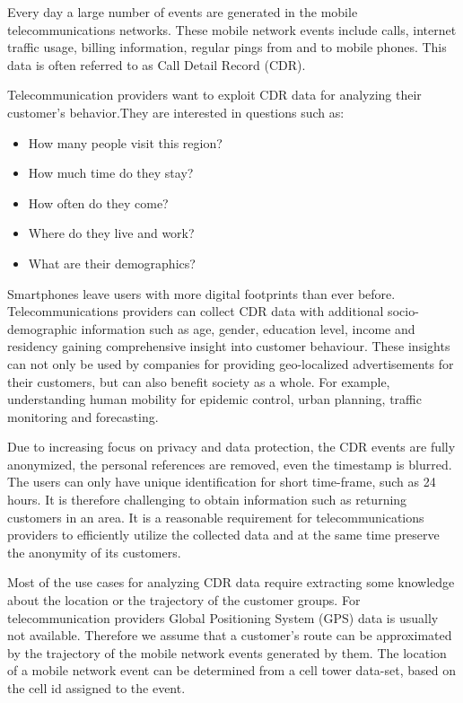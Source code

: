 Every day a large number of events are generated in the mobile telecommunications networks. These mobile network events include calls, internet traffic usage, billing information, regular pings from and to mobile phones. This data is often referred to as Call Detail Record (CDR).

Telecommunication providers want to exploit CDR data for analyzing their customer's behavior.They are interested in questions such as:
\begin{itemize}
\item How many people visit this region?
\item How much time do they stay?
\item How often do they come?
\item Where do they live and work?
\item What are their demographics?
\end{itemize}

Smartphones leave users with more digital footprints than ever before. Telecommunications providers can collect CDR data with additional socio-demographic information such as age, gender, education level, income and residency gaining comprehensive insight into customer behaviour. These insights can not only be used by companies for providing geo-localized advertisements for their customers, but can also benefit society as a whole. For example, understanding human mobility for epidemic control, urban planning, traffic monitoring and forecasting.

Due to increasing focus on privacy and data protection, the CDR events are fully anonymized, the personal references are removed, even the timestamp is blurred. The users can only have unique identification for short time-frame, such as 24 hours. It is therefore challenging to obtain information such as returning customers in an area. It is a reasonable requirement for telecommunications providers to efficiently utilize the collected data and at the same time preserve the anonymity of its customers. 

Most of the use cases for analyzing CDR data require extracting some knowledge about the location or the trajectory of the customer groups. For telecommunication providers Global Positioning System (GPS) data is usually not available. Therefore we assume that a customer's route can be approximated by the trajectory of the mobile network events generated by them. The location of a mobile network event can be determined from a cell tower data-set, based on the cell id assigned to the event.


